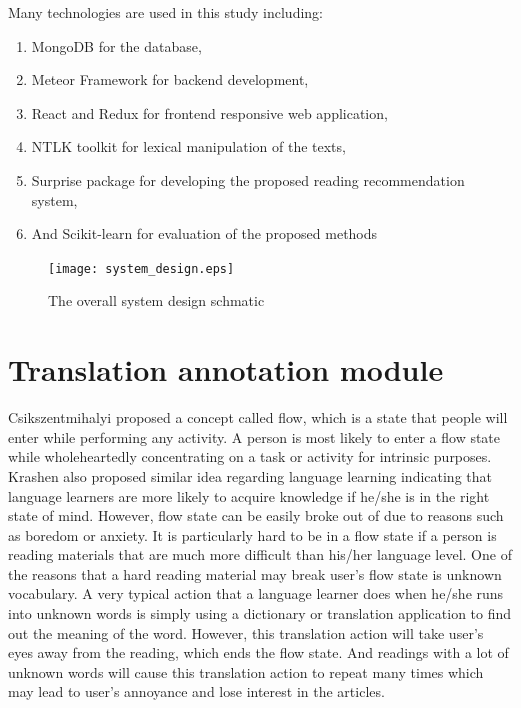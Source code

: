 Many technologies are used in this study including:
\begin{enumerate}
  \item MongoDB for the database, 
  \vspace{10pt}
  \item Meteor Framework for backend development,
  \vspace{10pt}
  \item React and Redux for frontend responsive web application,
  \vspace{10pt}
  \item NTLK toolkit for lexical manipulation of the texts,
  \vspace{10pt}
  \item Surprise package for developing the proposed reading recommendation system,
  \vspace{10pt}
  \item And Scikit-learn for evaluation of the proposed methods
  \vspace{10pt}
\end{enumerate}

\begin{figure}[tbp]
 \begin{center}
  \texttt{[image: system\_design.eps]}
 \end{center}
 \caption{\label{figure:system_design_schmatic} The overall system design schmatic}
\end{figure}

\section{Translation annotation module}

Csikszentmihalyi \cite{Csikszentmihalyi2002, Csikszentmihalyi1997, Csikszentmihalyi1975} proposed a concept called flow, which is a state that people will enter while performing any activity. A person is most likely to enter a flow state while wholeheartedly concentrating on a task or activity for intrinsic purposes. Krashen also proposed similar idea regarding language learning indicating that language learners are more likely to acquire knowledge if he/she is in the right state of mind. However, flow state can be easily broke out of due to reasons such as boredom or anxiety. It is particularly hard to be in a flow state if a person is reading materials that are much more difficult than his/her language level. One of the reasons that a hard reading material may break user's flow state is unknown vocabulary. A very typical action that a language learner does when he/she runs into unknown words is simply using a dictionary or translation application to find out the meaning of the word. However, this translation action will take user's eyes away from the reading, which ends the flow state. And readings with a lot of unknown words will cause this translation action to repeat many times which may lead to user's annoyance and lose interest in the articles. 

